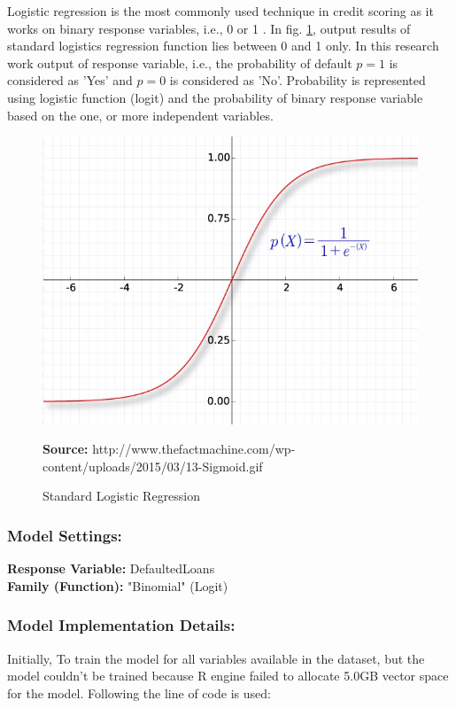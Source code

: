 Logistic regression is the most commonly used technique in credit scoring as it works on binary response variables, i.e., 0 or 1 \citep{hilbe2011logistic}. In fig. \ref{fig:logistic}, output results of standard logistics regression function lies between 0 and 1 only. In this research work output of response variable, i.e., the probability of default $p=1$ is considered as 'Yes' and $p=0$ is considered as 'No'. Probability is represented using logistic function (logit) and the probability of binary response variable based on the one, or more independent variables.

\begin{center}
\begin{figure}[ht]
\includegraphics[width=\textwidth]{logistic.jpg}
\centering
\caption{Standard Logistic Regression}{\textbf{Source:} http://www.thefactmachine.com/wp-content/uploads/2015/03/13-Sigmoid.gif}
\label{fig:logistic}
\end{figure}
\end{center}

\subsubsection*{Model Settings:}

\textbf{Response Variable:} DefaultedLoans\\
\textbf{Family (Function):} "Binomial" (Logit)

\subsubsection*{Model Implementation Details:}
Initially, To train the model for all variables available in the dataset, but the model couldn't be trained because R engine failed to allocate 5.0GB vector space for the model. Following the line of code is used:

